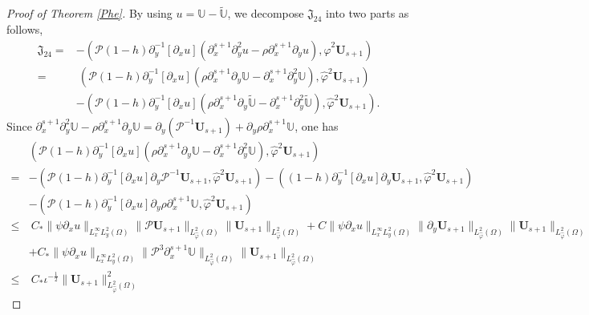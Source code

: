 \documentclass[10pt,a4paper]{amsart}
\begin{document}
\begin{proof}[Proof of Theorem \ref{Phe}]
By using $u=\mathbb{U}-\tilde{\mathbb{U}}$, we decompose $\mathfrak{J}_{24}$ into two parts as follows,
\begin{align}\label{JJ24}
\mathfrak{J}_{24}
=&-(\mathcal{P}(1-h)\partial_{y}^{-1}[\partial_{x}u](\partial_{x}^{s+1}\partial_{y}^{2}u-\rho\partial_{x}^{s+1}\partial_{y}u),\hat{\varphi}^{2}\mathbf{U}_{s+1})\\
=&~(\mathcal{P}(1-h)\partial_{y}^{-1}[\partial_{x}u](\rho\partial_{x}^{s+1}\partial_{y}\mathbb{U}-\partial_{x}^{s+1}\partial_{y}^{2}\mathbb{U}),\hat{\varphi}^{2}\mathbf{U}_{s+1})\nonumber\\
 &-(\mathcal{P}(1-h)\partial_{y}^{-1}[\partial_{x}u](\rho\partial_{x}^{s+1}\partial_{y}\tilde{\mathbb{U}}-\partial_{x}^{s+1}\partial_{y}^{2}\tilde{\mathbb{U}}),\hat{\varphi}^{2}\mathbf{U}_{s+1}).\nonumber
\end{align}
Since $\partial_{x}^{s+1}\partial_{y}^{2}\mathbb{U}-\rho\partial_{x}^{s+1}\partial_{y}\mathbb{U}=\partial_{y}(\mathcal{P}^{-1}\mathbf{U}_{s+1})+\partial_{y}\rho\partial_{x}^{s+1}\mathbb{U}$,
one has
\begin{align}\label{JJ241}
&(\mathcal{P}(1-h)\partial_{y}^{-1}[\partial_{x}u](\rho\partial_{x}^{s+1}\partial_{y}\mathbb{U}-\partial_{x}^{s+1}\partial_{y}^{2}\mathbb{U}),\hat{\varphi}^{2}\mathbf{U}_{s+1})\\
=&-(\mathcal{P}(1-h)\partial_{y}^{-1}[\partial_{x}u]\partial_{y}\mathcal{P}^{-1}\mathbf{U}_{s+1},\hat{\varphi}^{2}\mathbf{U}_{s+1})
  -((1-h)\partial_{y}^{-1}[\partial_{x}u]\partial_{y}\mathbf{U}_{s+1},\hat{\varphi}^{2}\mathbf{U}_{s+1})\nonumber\\
 &-(\mathcal{P}(1-h)\partial_{y}^{-1}[\partial_{x}u]\partial_{y}\rho\partial_{x}^{s+1}\mathbb{U},\hat{\varphi}^{2}\mathbf{U}_{s+1})\nonumber\\
\leq&~C_{*}\|\psi\partial_{x}u\|_{L_{x}^{\infty}L_{y}^{2}(\Omega)}
           \|\mathcal{P}\mathbf{U}_{s+1}\|_{L_{\hat{\varphi}}^{2}(\Omega)}
           \|\mathbf{U}_{s+1}\|_{L_{\hat{\varphi}}^{2}(\Omega)}
     +C\|\psi\partial_{x}u\|_{L_{x}^{\infty}L_{y}^{2}(\Omega)}
       \|\partial_{y}\mathbf{U}_{s+1}\|_{L_{\hat{\varphi}}^{2}(\Omega)}
       \|\mathbf{U}_{s+1}\|_{L_{\hat{\varphi}}^{2}(\Omega)}\nonumber\\
    &+C_{*}\|\psi\partial_{x}u\|_{L_{x}^{\infty}L_{y}^{2}(\Omega)}
           \|\mathcal{P}^{3}\partial_{x}^{s+1}\mathbb{U}\|_{L_{\hat{\varphi}}^{2}(\Omega)}
           \|\mathbf{U}_{s+1}\|_{L_{\hat{\varphi}}^{2}(\Omega)}\nonumber\\
\leq&~C_{*}\iota^{-\frac{1}{2}}\|\mathbf{U}_{s+1}\|_{L_{\hat{\varphi}}^{2}(\Omega)}^{2}

\end{align}
\end{proof}
\end{document}
